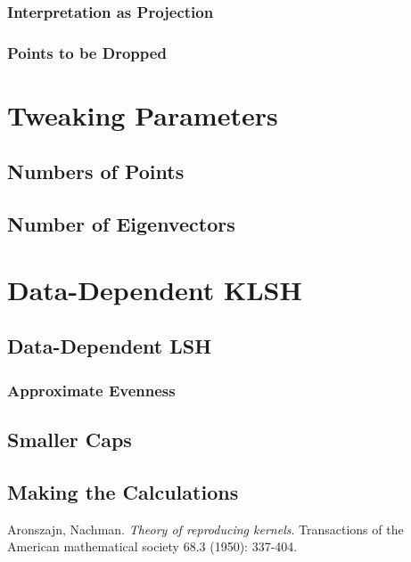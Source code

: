 \documentclass[twoside,11pt]{homework}
\begin{document}
\begin{multicols}{2}
\subsubsection{Interpretation as Projection} %

\subsubsection{Points to be Dropped} %

\section{Tweaking Parameters} %

\subsection{Numbers of Points}

\subsection{Number of Eigenvectors}

\section{Data-Dependent KLSH} %

\subsection{Data-Dependent LSH}

\subsubsection{Approximate Evenness}

\subsection{Smaller Caps}

\subsection{Making the Calculations}

\begin{thebibliography}{9}
  
 Aronszajn, Nachman. \emph{Theory of reproducing kernels}. Transactions of the American mathematical society 68.3 (1950): 337-404.


\end{thebibliography}
\end{multicols}
\end{document}
